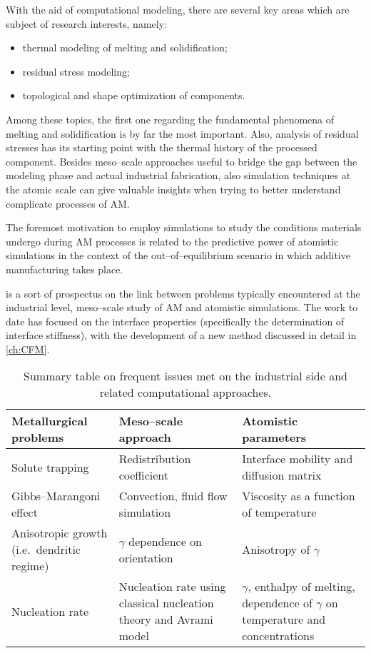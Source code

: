 With the aid of computational modeling, there are several key areas which are subject of research interests, namely:
\begin{itemize}
    \item thermal modeling of melting and solidification;
    \item residual stress modeling;
    \item topological and shape optimization of components.
\end{itemize}

Among these topics, the first one regarding the fundamental phenomena of melting and solidification is by far the most important. Also, analysis of residual stresses has its starting point with the thermal history of the processed component.
Besides meso--scale approaches useful to bridge the gap between the modeling phase and actual industrial fabrication, also simulation techniques at the atomic scale can give valuable insights when trying to better understand complicate processes of AM.

The foremost motivation to employ simulations to study the conditions materials undergo during AM processes is related to the predictive power of atomistic simulations in the context of the out--of--equilibrium scenario in which additive manufacturing takes place.

 is a sort of prospectus on the link between problems typically encountered at the industrial level, meso--scale study of AM and atomistic simulations. The work to date has focused on the interface properties (specifically the determination of interface stiffness), with the development of a new method discussed in detail in \cref{ch:CFM}.

\begin{table}[tb]
\centering
\caption{Summary table on frequent issues met on the industrial side and related computational approaches.}
\label{tab:modeling_roadmap}
\begin{tabularx}{\textwidth}{*{3}{X}}
\toprule
    \textbf{Metallurgical problems} & \textbf{Meso--scale approach} & \textbf{Atomistic parameters} \\
    \midrule
    Solute trapping & Redistribution coefficient & Interface mobility and diffusion matrix \\
    Gibbs--Marangoni effect & Convection, fluid flow simulation & Viscosity as a function of temperature\\
    Anisotropic growth (i.e.\ dendritic regime) & $\gamma$ dependence on orientation & Anisotropy of $\gamma$ \\
    Nucleation rate & Nucleation rate using classical nucleation theory and Avrami model & $\gamma$, enthalpy of melting, dependence of $\gamma$ on temperature and concentrations\\
    \bottomrule 
\end{tabularx}
\end{table}





